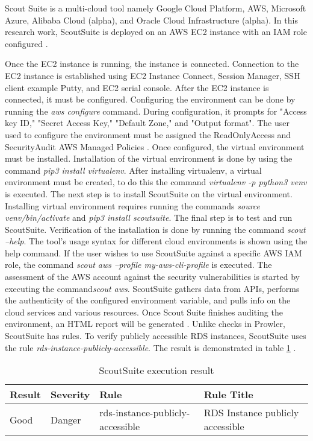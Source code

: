 \par Scout Suite is a multi-cloud tool namely Google Cloud Platform, AWS, Microsoft Azure, Alibaba Cloud (alpha), and
Oracle Cloud Infrastructure (alpha).
In this research work, ScoutSuite is deployed on an AWS EC2 instance with an
IAM role configured \cite{73}.

\par Once the EC2 instance is running, the instance is connected.
Connection to the EC2 instance is established using EC2 Instance Connect, Session Manager, SSH client example Putty, and EC2 serial console.
After the EC2 instance is connected, it must be configured.
Configuring the environment can be done by running the
\textit{aws configure} command.
During configuration, it prompts for "Access key ID," "Secret Access Key," "Default Zone," and "Output format".
The user used to configure the environment must
be assigned the
ReadOnlyAccess and SecurityAudit AWS Managed Policies \cite{76}.
Once configured, the virtual environment must be installed.
Installation of the virtual environment is done by using the command \textit{pip3 install virtualenv}.
After installing virtualenv, a virtual environment must be created, to do this the command \textit{virtualenv -p python3 venv} is executed.
The next step is to install ScoutSuite on the virtual environment.
Installing virtual environment requires running the commands \textit{source venv/bin/activate} and \textit{pip3 install scoutsuite}.
The final step is to test and run ScoutSuite.
Verification of the installation is done by running the command \textit{scout --help}.
The tool's usage syntax for different cloud environments is shown using the help command.
If the user wishes to use ScoutSuite against a specific
AWS IAM role, the command \textit{scout aws --profile my-aws-cli-profile} is executed.
The assessment of the AWS account against the security
vulnerabilities is started by executing the command\textit{scout aws}.
ScoutSuite gathers data from APIs, performs the authenticity of the configured environment variable, and pulls info on the cloud services and various resources.
Once Scout Suite finishes auditing the environment, an HTML report will be generated \cite{77}.
Unlike checks in Prowler, ScoutSuite has rules.
To verify publicly accessible RDS instances, ScoutSuite uses the rule \textit{rds-instance-publicly-accessible}.
The result is demonstrated in table \ref{tab:scoutsuiterule} \cite{77}.

\begin{table}[h!]
    \begin{center}
        \caption{ScoutSuite execution result}
        \label{tab:scoutsuiterule}
        \begin{tabular}{|p{1.4cm}|p{1.7cm}|p{5.0cm}|p{6.0cm}|}
            \hline
            \textbf{Result} & \textbf{Severity} & \textbf{Rule} & \textbf{Rule Title}\\
            \hline
            Good & Danger & rds-instance-publicly-accessible & RDS Instance publicly accessible \\
            \hline
        \end{tabular}
    \end{center}
\end{table}


